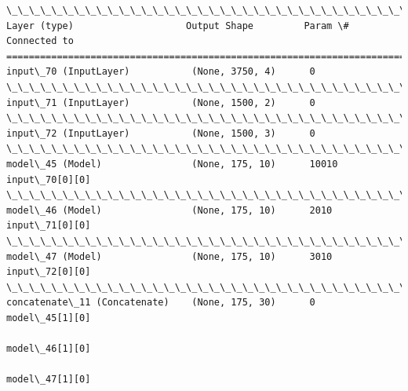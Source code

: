 \documentclass[11pt]{article}
\begin{document}
    \begin{Verbatim}[commandchars=\\\{\}]
\_\_\_\_\_\_\_\_\_\_\_\_\_\_\_\_\_\_\_\_\_\_\_\_\_\_\_\_\_\_\_\_\_\_\_\_\_\_\_\_\_\_\_\_\_\_\_\_\_\_\_\_\_\_\_\_\_\_\_\_\_\_\_\_\_\_\_\_\_\_\_\_\_\_\_\_\_\_\_\_\_\_\_\_\_\_\_\_\_\_\_\_\_\_\_\_\_\_
Layer (type)                    Output Shape         Param \#     Connected to                     
==================================================================================================
input\_70 (InputLayer)           (None, 3750, 4)      0                                            
\_\_\_\_\_\_\_\_\_\_\_\_\_\_\_\_\_\_\_\_\_\_\_\_\_\_\_\_\_\_\_\_\_\_\_\_\_\_\_\_\_\_\_\_\_\_\_\_\_\_\_\_\_\_\_\_\_\_\_\_\_\_\_\_\_\_\_\_\_\_\_\_\_\_\_\_\_\_\_\_\_\_\_\_\_\_\_\_\_\_\_\_\_\_\_\_\_\_
input\_71 (InputLayer)           (None, 1500, 2)      0                                            
\_\_\_\_\_\_\_\_\_\_\_\_\_\_\_\_\_\_\_\_\_\_\_\_\_\_\_\_\_\_\_\_\_\_\_\_\_\_\_\_\_\_\_\_\_\_\_\_\_\_\_\_\_\_\_\_\_\_\_\_\_\_\_\_\_\_\_\_\_\_\_\_\_\_\_\_\_\_\_\_\_\_\_\_\_\_\_\_\_\_\_\_\_\_\_\_\_\_
input\_72 (InputLayer)           (None, 1500, 3)      0                                            
\_\_\_\_\_\_\_\_\_\_\_\_\_\_\_\_\_\_\_\_\_\_\_\_\_\_\_\_\_\_\_\_\_\_\_\_\_\_\_\_\_\_\_\_\_\_\_\_\_\_\_\_\_\_\_\_\_\_\_\_\_\_\_\_\_\_\_\_\_\_\_\_\_\_\_\_\_\_\_\_\_\_\_\_\_\_\_\_\_\_\_\_\_\_\_\_\_\_
model\_45 (Model)                (None, 175, 10)      10010       input\_70[0][0]                   
\_\_\_\_\_\_\_\_\_\_\_\_\_\_\_\_\_\_\_\_\_\_\_\_\_\_\_\_\_\_\_\_\_\_\_\_\_\_\_\_\_\_\_\_\_\_\_\_\_\_\_\_\_\_\_\_\_\_\_\_\_\_\_\_\_\_\_\_\_\_\_\_\_\_\_\_\_\_\_\_\_\_\_\_\_\_\_\_\_\_\_\_\_\_\_\_\_\_
model\_46 (Model)                (None, 175, 10)      2010        input\_71[0][0]                   
\_\_\_\_\_\_\_\_\_\_\_\_\_\_\_\_\_\_\_\_\_\_\_\_\_\_\_\_\_\_\_\_\_\_\_\_\_\_\_\_\_\_\_\_\_\_\_\_\_\_\_\_\_\_\_\_\_\_\_\_\_\_\_\_\_\_\_\_\_\_\_\_\_\_\_\_\_\_\_\_\_\_\_\_\_\_\_\_\_\_\_\_\_\_\_\_\_\_
model\_47 (Model)                (None, 175, 10)      3010        input\_72[0][0]                   
\_\_\_\_\_\_\_\_\_\_\_\_\_\_\_\_\_\_\_\_\_\_\_\_\_\_\_\_\_\_\_\_\_\_\_\_\_\_\_\_\_\_\_\_\_\_\_\_\_\_\_\_\_\_\_\_\_\_\_\_\_\_\_\_\_\_\_\_\_\_\_\_\_\_\_\_\_\_\_\_\_\_\_\_\_\_\_\_\_\_\_\_\_\_\_\_\_\_
concatenate\_11 (Concatenate)    (None, 175, 30)      0           model\_45[1][0]                   
                                                                 model\_46[1][0]                   
                                                                 model\_47[1][0]                   

\end{Verbatim}
\end{document}
